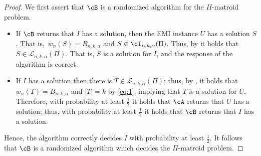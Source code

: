 \begin{proof}
	We first assert that $\cB$ is a randomized algorithm for the $\Pi$-matroid problem.
		\begin{itemize}
		\item If $\cB$ returns that $I$ has a solution, then the EMI instance $U$ has a solution $S$. 
		That is,~$w_n(S) = B_{n,k,\alpha}$ and $S \in \cI_{n,k,\alpha}(\Pi)$. Thus, by  it holds that $S\in \mathcal{L}_{n,k,\alpha}(\Pi)$. That is, $S$ is a solution for $I$, and the response of the algorithm is correct. 
		\item If $I$ has a solution then there is $T \in \mathcal{L}_{n,k,\alpha}(\Pi)$; thus, by  , it holds that  $w_n(T) = B_{n,k,\alpha}$ and $|T|=k$ by \eqref{eq:1}, implying that $T$ is a solution for $U$. Therefore, with probability  at least $\frac{1}{2}$ it holds that $\cA$ returns that $U$ has a solution; thus, with probability  at least $\frac{1}{2}$ it holds that $\cB$ returns that $I$ has a solution. 
	\end{itemize}
	Hence, 
	the algorithm correctly decides  $I$ with probability at least $\frac{1}{2}$. %
	It follows that $\cB$ is %
	a randomized algorithm which decides the $\Pi$-matroid problem.
	
	
	

\end{proof}
